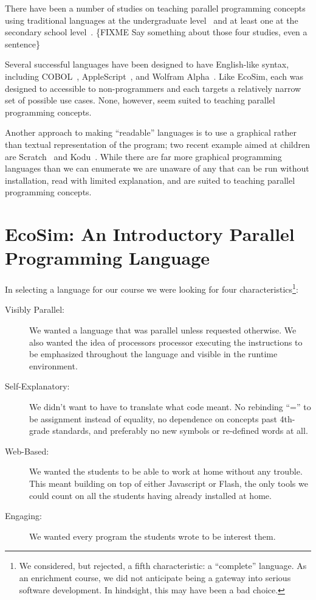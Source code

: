 \documentclass{sig-alternate}
\newcommand{\FIXME}[1]{{\color{red}\{FIXME #1\}}}
\newcommand{\EcoSim}{EcoSim}
\begin{document}
There have been a number of studies on teaching 
parallel programming concepts using traditional languages at the 
undergraduate level~\cite{freshmanParallel,undergraduateParallel,gridPortal} 
and at least one at the secondary school level~\cite{highSchoolParallel}.
\FIXME{Say something about those four studies, even a sentence}

Several successful languages have been designed to have English-like syntax,
including COBOL~\cite{COBOL59}, AppleScript~\cite{AppleScript}, and Wolfram Alpha~\cite{WolframAlpha}.
Like \EcoSim{}, each was designed to accessible to non-programmers
and each targets a relatively narrow set of possible use cases.
None, however, seem suited to teaching parallel programming concepts.

Another approach to making ``readable'' languages 
is to use a graphical rather than textual representation of the program;
two recent example aimed at children are Scratch~\cite{Scratch} and Kodu~\cite{Kodu}.
While there are far more graphical programming languages than we can enumerate
we are unaware of any that can be run without installation, 
read with limited explanation, and are suited to teaching parallel programming concepts.



\section{\EcoSim{}: An Introductory Parallel Programming Language}
In selecting a language for our course we were looking for four characteristics\footnote{
We considered, but rejected, a fifth characteristic: a ``complete'' language.
As an enrichment course, we did not anticipate being a gateway into serious software development.
In hindsight, this may have been a bad choice.
}:
\begin{description}
	\item[Visibly Parallel:]
		We wanted a language that was parallel unless requested otherwise.
		We also wanted the idea of processors processor executing the instructions
		to be emphasized throughout the language and visible in the runtime environment.
	\item[Self-Explanatory:]
		We didn't want to have to translate what code meant.
		No rebinding ``='' to be assignment instead of equality,
		no dependence on concepts past 4th-grade standards,
		and preferably no new symbols or re-defined words at all.
	\item[Web-Based:]
		We wanted the students to be able to work at home without any trouble.
		This meant building on top of either Javascript or Flash, 
		the only tools we could count on all the students having already installed at home.
	\item[Engaging:]
		We wanted every program the students wrote to be interest them.
\end{description}
\end{document}
